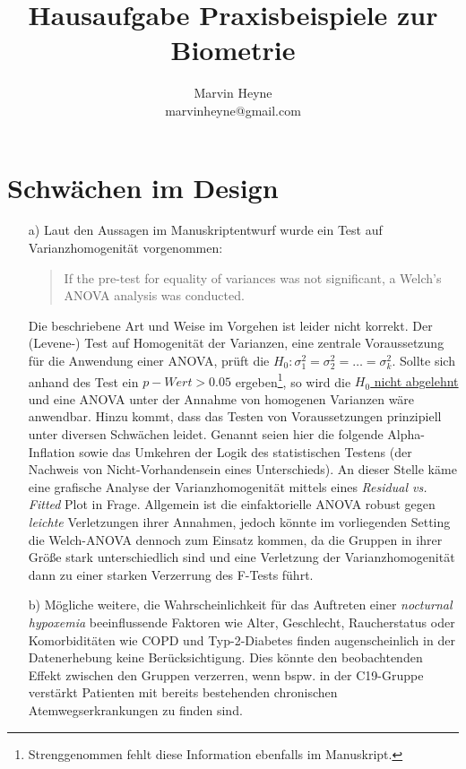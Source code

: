 \documentclass{scrartcl}
\title{Hausaufgabe Praxisbeispiele zur Biometrie}
\author{Marvin Heyne\\
  	\small marvinheyne@gmail.com \\
}
\theoremstyle{definition}
\theoremstyle{remark}
\begin{document}
\maketitle
\tableofcontents
\noindent


\section{Schwächen im Design}
\begin{enumerate}
	\item[a) ]Laut den Aussagen im Manuskriptentwurf wurde ein Test auf Varianzhomogenität vorgenommen: 
	\begin{quotation}
		If the pre-test for equality of variances was not significant, a Welch's ANOVA analysis was conducted.
	\end{quotation}
	Die beschriebene Art und Weise im Vorgehen ist leider nicht korrekt. Der (Levene-) Test auf Homogenität der Varianzen, eine zentrale Voraussetzung für die Anwendung einer ANOVA, prüft die $H_0: \sigma^{2}_{1} = \sigma^{2}_{2} = \dots = \sigma^{2}_k$. Sollte sich anhand des Test ein $p-Wert>0.05$ ergeben\footnote{Strenggenommen fehlt diese Information ebenfalls im Manuskript.}, so wird die \underline{$H_0$ nicht abgelehnt} und eine ANOVA unter der Annahme von homogenen Varianzen wäre anwendbar. Hinzu kommt, dass das Testen von Voraussetzungen prinzipiell unter diversen Schwächen leidet. Genannt seien hier die folgende Alpha-Inflation sowie das Umkehren der Logik des statistischen Testens (der Nachweis von Nicht-Vorhandensein eines Unterschieds). An dieser Stelle käme eine grafische Analyse der Varianzhomogenität mittels eines \textit{Residual vs. Fitted} Plot in Frage. Allgemein ist die einfaktorielle ANOVA  robust gegen \textit{leichte} Verletzungen ihrer Annahmen, jedoch könnte im vorliegenden Setting die Welch-ANOVA  dennoch zum Einsatz kommen, da die Gruppen in ihrer Größe stark unterschiedlich sind und eine Verletzung der Varianzhomogenität dann zu einer starken Verzerrung des F-Tests führt.
	\item[b) ]Mögliche weitere, die Wahrscheinlichkeit für das Auftreten einer \textit{nocturnal hypoxemia} beeinflussende Faktoren wie Alter, Geschlecht, Raucherstatus oder Komorbiditäten wie COPD und Typ-2-Diabetes finden augenscheinlich in der Datenerhebung keine Berücksichtigung. Dies könnte den beobachtenden Effekt zwischen den Gruppen verzerren, wenn bspw. in der C19-Gruppe verstärkt Patienten mit bereits bestehenden chronischen Atemwegserkrankungen zu finden sind.
\end{enumerate}
\end{document}
